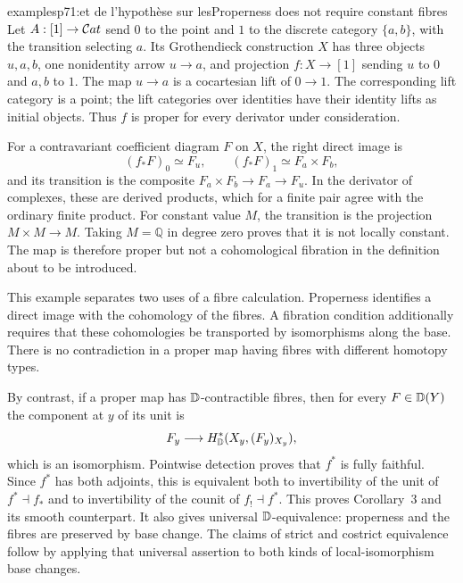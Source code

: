 \begin{dcomment}{examples}{p71:et de l'hypothèse sur les}{Properness does not require constant fibres}
Let $A:[1]\to\mathcal{C}at$ send $0$ to the point and $1$ to the discrete category $\{a,b\}$, with the transition selecting $a$. Its Grothendieck construction $X$ has three objects $u,a,b$, one nonidentity arrow $u\to a$, and projection $f:X\to[1]$ sending $u$ to $0$ and $a,b$ to $1$. The map $u\to a$ is a cocartesian lift of $0\to1$. The corresponding lift category is a point; the lift categories over identities have their identity lifts as initial objects. Thus $f$ is proper for every derivator under consideration.

For a contravariant coefficient diagram $F$ on $X$, the right direct image is
\[
 (f_*F)_0\simeq F_u,\qquad
 (f_*F)_1\simeq F_a\times F_b,
\]
and its transition is the composite $F_a\times F_b\to F_a\to F_u$. In the derivator of complexes, these are derived products, which for a finite pair agree with the ordinary finite product. For constant value $M$, the transition is the projection $M\times M\to M$. Taking $M=\mathbb Q$ in degree zero proves that it is not locally constant. The map is therefore proper but not a cohomological fibration in the definition about to be introduced.

This example separates two uses of a fibre calculation. Properness identifies a direct image with the cohomology of the fibres. A fibration condition additionally requires that these cohomologies be transported by isomorphisms along the base. There is no contradiction in a proper map having fibres with different homotopy types.

By contrast, if a proper map has $\mathbb{D}$-contractible fibres, then for every $F\in\mathbb{D}(Y)$ the component at $y$ of its unit is
\[
 F_y\longrightarrow H^*_{\mathbb{D}}(X_y,(F_y)_{X_y}),
\]
which is an isomorphism. Pointwise detection proves that $f^*$ is fully faithful. Since $f^*$ has both adjoints, this is equivalent both to invertibility of the unit of $f^*\dashv f_*$ and to invertibility of the counit of $f_!\dashv f^*$. This proves Corollary~3 and its smooth counterpart. It also gives universal $\mathbb{D}$-equivalence: properness and the fibres are preserved by base change. The claims of strict and costrict equivalence follow by applying that universal assertion to both kinds of local-isomorphism base changes.
\end{dcomment}




